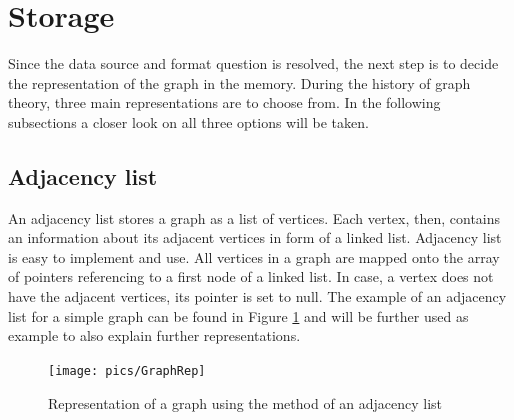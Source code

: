 \documentclass[thesis=M,english]{FITthesis}[2012/10/20]
\begin{document}

\section{Storage}
Since the data source and format question is resolved, the next step is to decide the representation of the graph in the memory. During the history of graph theory, three main representations are to choose from. In the following subsections a closer look on all three options will be taken.

\subsection{Adjacency list}
An adjacency list stores a graph as a list of vertices. Each vertex, then, contains an information about its adjacent vertices in form of a linked list. Adjacency list is easy to implement and use. All vertices in a graph are mapped onto the array of pointers referencing to a first node of a linked list. In case, a vertex does not have the adjacent vertices, its pointer is set to null. The example of an adjacency list for a simple graph can be found in Figure \ref{pic:AdjacencyList} and will be further used as example to also explain further representations. 

\begin{figure}[h]
\centering
\texttt{[image: pics/GraphRep]}
\caption{Representation of a graph using the method of an adjacency list}
\label{pic:AdjacencyList}
\end{figure}
\end{document}
